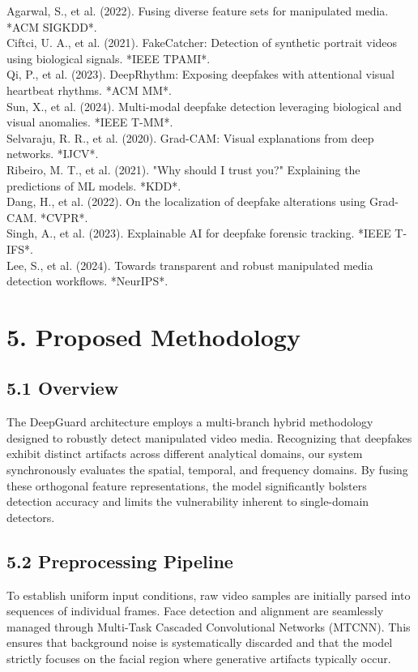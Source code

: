 \documentclass[12pt,a4paper]{article}
\begin{document}
\noindent [17] Agarwal, S., et al. (2022). Fusing diverse feature sets for manipulated media. *ACM SIGKDD*.\\[0.5em]
\noindent [18] Ciftci, U. A., et al. (2021). FakeCatcher: Detection of synthetic portrait videos using biological signals. *IEEE TPAMI*.\\[0.5em]
\noindent [19] Qi, P., et al. (2023). DeepRhythm: Exposing deepfakes with attentional visual heartbeat rhythms. *ACM MM*.\\[0.5em]
\noindent [20] Sun, X., et al. (2024). Multi-modal deepfake detection leveraging biological and visual anomalies. *IEEE T-MM*.\\[0.5em]
\noindent [21] Selvaraju, R. R., et al. (2020). Grad-CAM: Visual explanations from deep networks. *IJCV*.\\[0.5em]
\noindent [22] Ribeiro, M. T., et al. (2021). "Why should I trust you?" Explaining the predictions of ML models. *KDD*.\\[0.5em]
\noindent [23] Dang, H., et al. (2022). On the localization of deepfake alterations using Grad-CAM. *CVPR*.\\[0.5em]
\noindent [24] Singh, A., et al. (2023). Explainable AI for deepfake forensic tracking. *IEEE T-IFS*.\\[0.5em]
\noindent [25] Lee, S., et al. (2024). Towards transparent and robust manipulated media detection workflows. *NeurIPS*.\\[0.5em]
\section{5. Proposed Methodology}
\subsection{5.1 Overview}
The DeepGuard architecture employs a multi-branch hybrid methodology designed to robustly detect manipulated video media. Recognizing that deepfakes exhibit distinct artifacts across different analytical domains, our system synchronously evaluates the spatial, temporal, and frequency domains. By fusing these orthogonal feature representations, the model significantly bolsters detection accuracy and limits the vulnerability inherent to single-domain detectors.

\subsection{5.2 Preprocessing Pipeline}
To establish uniform input conditions, raw video samples are initially parsed into sequences of individual frames. Face detection and alignment are seamlessly managed through Multi-Task Cascaded Convolutional Networks (MTCNN). This ensures that background noise is systematically discarded and that the model strictly focuses on the facial region where generative artifacts typically occur.
\end{document}
